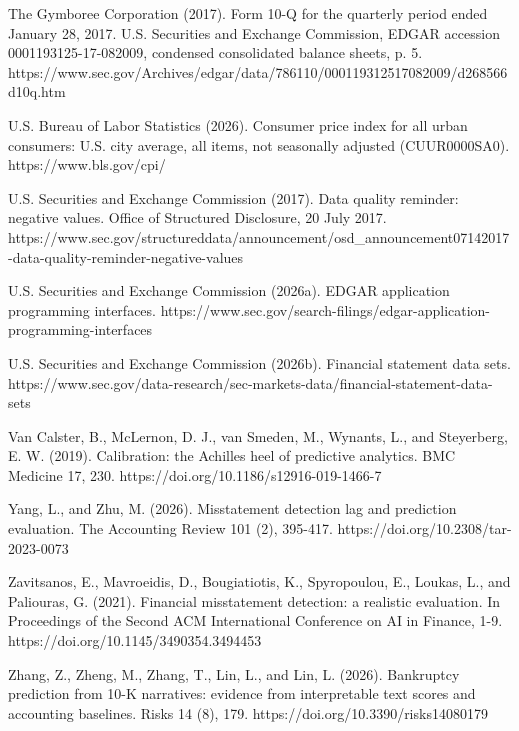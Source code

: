 \documentclass[10pt,a4paper,twocolumn]{article}
\begin{document}
\noindent The Gymboree Corporation (2017). Form 10-Q for the quarterly period ended January 28, 2017. U.S. Securities and Exchange Commission, EDGAR accession 0001193125-17-082009, condensed consolidated balance sheets, p. 5. https://www.sec.gov/Archives/edgar/data/786110/000119312517082009/d268566d10q.htm\par\vspace{2pt}
\noindent U.S. Bureau of Labor Statistics (2026). Consumer price index for all urban consumers: U.S. city average, all items, not seasonally adjusted (CUUR0000SA0). https://www.bls.gov/cpi/\par\vspace{2pt}
\noindent U.S. Securities and Exchange Commission (2017). Data quality reminder: negative values. Office of Structured Disclosure, 20 July 2017. https://www.sec.gov/structureddata/announcement/osd\_announcement07142017-data-quality-reminder-negative-values\par\vspace{2pt}
\noindent U.S. Securities and Exchange Commission (2026a). EDGAR application programming interfaces. https://www.sec.gov/search-filings/edgar-application-programming-interfaces\par\vspace{2pt}
\noindent U.S. Securities and Exchange Commission (2026b). Financial statement data sets. https://www.sec.gov/data-research/sec-markets-data/financial-statement-data-sets\par\vspace{2pt}
\noindent Van Calster, B., McLernon, D. J., van Smeden, M., Wynants, L., and Steyerberg, E. W. (2019). Calibration: the Achilles heel of predictive analytics. BMC Medicine 17, 230. https://doi.org/10.1186/s12916-019-1466-7\par\vspace{2pt}
\noindent Yang, L., and Zhu, M. (2026). Misstatement detection lag and prediction evaluation. The Accounting Review 101 (2), 395-417. https://doi.org/10.2308/tar-2023-0073\par\vspace{2pt}
\noindent Zavitsanos, E., Mavroeidis, D., Bougiatiotis, K., Spyropoulou, E., Loukas, L., and Paliouras, G. (2021). Financial misstatement detection: a realistic evaluation. In Proceedings of the Second ACM International Conference on AI in Finance, 1-9. https://doi.org/10.1145/3490354.3494453\par\vspace{2pt}
\noindent Zhang, Z., Zheng, M., Zhang, T., Lin, L., and Lin, L. (2026). Bankruptcy prediction from 10-K narratives: evidence from interpretable text scores and accounting baselines. Risks 14 (8), 179. https://doi.org/10.3390/risks14080179\par\vspace{2pt}
\endgroup
\end{document}

